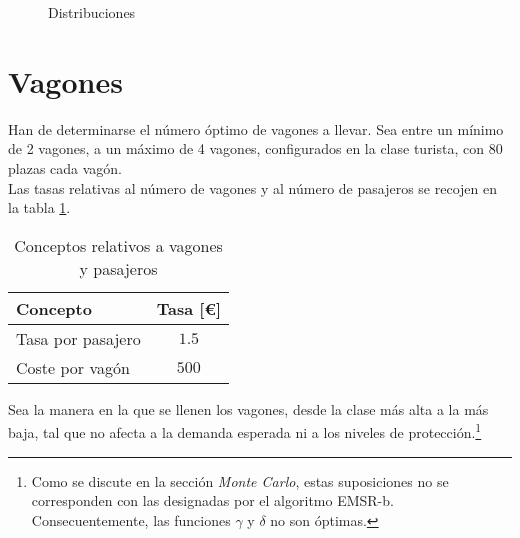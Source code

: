\documentclass[12pt]{article}
\begin{document}
\begin{figure}
\centering



\caption{Distribuciones}\label{fig:tablag}
\end{figure}



\section{Vagones}

Han de determinarse el número óptimo de vagones a llevar. Sea entre un mínimo de 2 vagones, a un máximo de 4 vagones, configurados en la clase turista, con 80 plazas cada vagón.\\


Las tasas relativas al número de vagones y al número de pasajeros se recojen en la tabla \ref{tab:vag}.




\begin{table}[!htp]\centering

\begin{tabular}{lc}\toprule
Concepto & Tasa [\euro] \\\midrule
Tasa por pasajero & $1.5$\\
Coste por vagón & $500$\\
\bottomrule
\end{tabular}

\caption{Conceptos relativos a vagones y pasajeros}\label{tab:vag}
\end{table}


Sea la manera en la que se llenen los vagones, desde la clase más alta a la más baja, tal que no afecta a la demanda esperada ni a los niveles de protección.\footnote{Como se discute en la sección \emph{Monte Carlo}, estas suposiciones no se corresponden con las designadas por el algoritmo EMSR-b. Consecuentemente, las funciones $\gamma$ y $\delta$ no son óptimas.}\\
\end{document}
